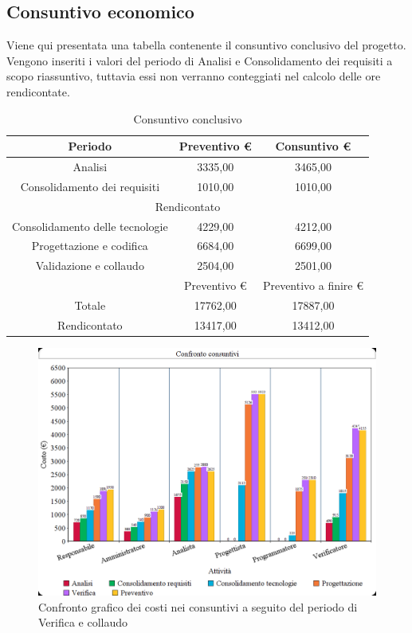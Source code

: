 \documentclass[./PianodiProgetto.tex]{subfiles}
\begin{document}
\subsection{Consuntivo economico}
Viene qui presentata una tabella contenente il consuntivo conclusivo del progetto. Vengono inseriti i valori del periodo di Analisi e Consolidamento dei requisiti a scopo riassuntivo,
tuttavia essi non verranno conteggiati nel calcolo delle ore rendicontate.

\begin{table}[H]
	\centering
	\begin{tabular}{|c|c|c|}
		\hline
		Periodo&Preventivo \euro{}&Consuntivo \euro{} \\ \hline
		Analisi&3335,00&3465,00  \\ \hline
		Consolidamento dei requisiti&1010,00&1010,00  \\ \hline
		\multicolumn{3}{|c|}{Rendicontato}  \\ \hline
		Consolidamento delle tecnologie&4229,00&4212,00  \\ \hline
		Progettazione e codifica&6684,00&6699,00  \\ \hline
		Validazione e collaudo&2504,00&2501,00  \\ \hline
		&Preventivo \euro{}&Preventivo a finire \euro{}  \\ \hline
		Totale&17762,00&17887,00 \\ \hline
		Rendicontato&13417,00&13412,00 \\ \hline
	\end{tabular}
	\caption{Consuntivo conclusivo}
\end{table}

\begin{figure}[H]
	\centering
	\includegraphics[width=1\linewidth]{img/grafici/CostiConsuntivi/consuntivo-costo-verifica}
	\caption{Confronto grafico dei costi nei consuntivi a seguito del periodo di Verifica e collaudo}
	\label{fig:consuntivo-costi-verifica}
\end{figure}
\end{document}
